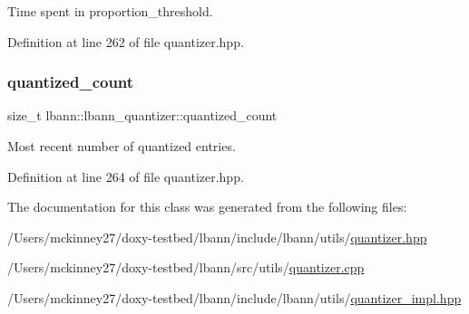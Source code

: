 Time spent in proportion\+\_\+threshold. 

Definition at line 262 of file quantizer.\+hpp.

\mbox{\label{classlbann_1_1lbann__quantizer_a716fae78ef5ba082a8093f0d06550804}} 
\subsubsection{\texorpdfstring{quantized\+\_\+count}{quantized\_count}}
{\footnotesize\ttfamily size\+\_\+t lbann\+::lbann\+\_\+quantizer\+::quantized\+\_\+count\hspace{0.3cm}{\ttfamily [private]}}

Most recent number of quantized entries. 

Definition at line 264 of file quantizer.\+hpp.



The documentation for this class was generated from the following files\+:\begin{DoxyCompactItemize}
\item 
/\+Users/mckinney27/doxy-\/testbed/lbann/include/lbann/utils/\hyperlink{quantizer_8hpp}{quantizer.\+hpp}\item 
/\+Users/mckinney27/doxy-\/testbed/lbann/src/utils/\hyperlink{quantizer_8cpp}{quantizer.\+cpp}\item 
/\+Users/mckinney27/doxy-\/testbed/lbann/include/lbann/utils/\hyperlink{quantizer__impl_8hpp}{quantizer\+\_\+impl.\+hpp}\end{DoxyCompactItemize}
